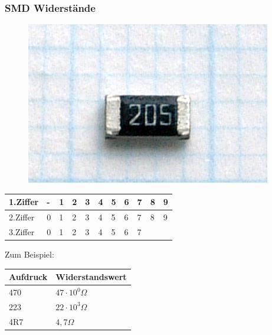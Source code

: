 \begin{frame}
    \frametitle{SMD Widerstände}
    \begin{center}
        \begin{figure}
      \includegraphics[width=\textwidth,height=.2\textheight,keepaspectratio]{e04/Rsistor_SMD.jpg}
    \end{figure}
    \end{center}
    \begin{center}
    \begin{tabular}{l||l|l|l|l|l|l|l|l|l|l}\hline
        1.Ziffer & - & 1 &2 & 3 & 4 & 5 & 6 & 7 & 8 & 9 \\ \hline
        2.Ziffer & 0 & 1 &2 & 3 & 4 & 5 & 6 & 7 & 8 & 9 \\ \hline
        3.Ziffer & 0 & 1 &2 & 3 & 4 & 5 & 6 & 7 &  &  \\ \hline
    \end{tabular}
    \end{center}
    Zum Beispiel:
    \begin{center}
    \begin{tabular}{l||l}\hline
	Aufdruck & Widerstandswert \\ \hline
        470 & $47 \cdot 10^{0} \Omega$ \\ \hline
        223 & $22 \cdot 10^{3} \Omega$ \\ \hline
        4R7 & $4,7 \Omega$ \\ \hline
    \end{tabular}
    \end{center}

\end{frame}
